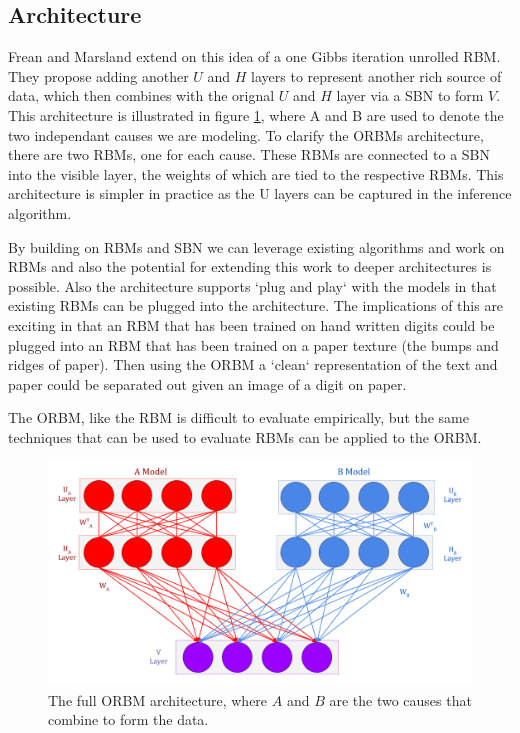 \subsection{Architecture}

Frean and Marsland extend on this idea of a one Gibbs iteration unrolled RBM. They propose adding another $U$ and $H$ layers to represent another rich source of data, which then combines with the orignal $U$ and $H$ layer via a SBN to form $V$. This architecture is illustrated in figure \ref{ORBM-Architecture}, where A and B are used to denote the two independant causes we are modeling. To clarify the ORBMs architecture, there are two RBMs, one for each cause. These RBMs are connected to a SBN into the visible layer, the weights of which are tied to the respective RBMs. This architecture is simpler in practice as the U layers can be captured in the inference algorithm.

By building on RBMs and SBN we can leverage existing algorithms and work on RBMs and also the potential for extending this work to deeper architectures is possible. Also the architecture supports `plug and play` with the models in that existing RBMs can be plugged into the architecture. The implications of this are exciting in that an RBM that has been trained on hand written digits could be plugged into an RBM that has been trained on a paper texture (the bumps and ridges of paper). Then using the ORBM a `clean` representation of the text and paper could be separated out given an image of a digit on paper.

The ORBM, like the RBM is difficult to evaluate empirically, but the same techniques that can be used to evaluate RBMs can be applied to the ORBM.\@

\begin{figure}[h]
\begin{center}
  \includegraphics[width = 1.2\textwidth]{Assets/ORBM-Full-Architecture.png}
\caption{The full ORBM architecture, where $A$ and $B$ are the two causes that combine to form the data.}
\label{ORBM-Architecture}
\end{center}
\end{figure}

